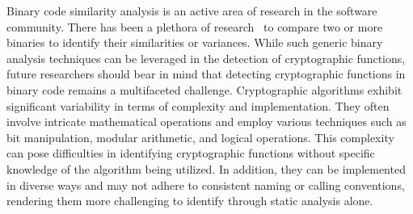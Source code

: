 Binary code similarity analysis is an active area of research in the software community. There has been a plethora of research~\cite{david2017similarity, saebjornsen2014detecting, liu2018eclone, chandramohan2016bingo, mckee2019software, ding2019asm2vec, ming2017binsim, xu2017neural} to compare two or more binaries to identify their similarities or variances.  
While such generic binary analysis techniques can be leveraged in the detection of cryptographic functions, future researchers should bear in mind that detecting cryptographic functions in binary code remains a multifaceted challenge. Cryptographic algorithms exhibit significant variability in terms of complexity and implementation. They often involve intricate mathematical operations and employ various techniques such as bit manipulation, modular arithmetic, and logical operations. This complexity can pose difficulties in identifying cryptographic functions without specific knowledge of the algorithm being utilized.
In addition, they can be implemented in diverse ways and may not adhere to consistent naming or calling conventions, rendering them more challenging to identify through static analysis alone.




